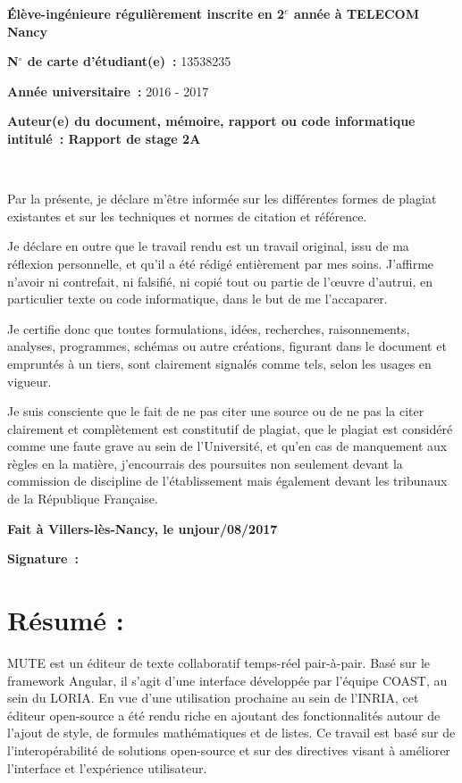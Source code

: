 \documentclass[12pt]{article}
\begin{document}
\textbf{\'{E}lève-ingénieure régulièrement inscrite en 2$^{e}$
année à TELECOM Nancy}

\textbf{N$^\circ{}$ de carte d'étudiant(e)~:} 13538235

\textbf{Année universitaire~:} 2016 - 2017

\textbf{Auteur(e) du document, m\'{e}moire, rapport ou code informatique
intitul\'{e}~: Rapport de stage 2A}

$ $


Par la présente, je déclare m'être informée sur les
différentes formes de plagiat existantes et sur les techniques et normes de
citation et référence.

Je déclare en outre que le travail rendu est un travail original, issu de ma
réflexion personnelle, et qu'il a été rédigé entièrement
par mes soins. J'affirme n'avoir ni contrefait, ni falsifié, ni copié
tout ou partie de l'\oe{}uvre d'autrui, en particulier texte ou code
informatique, dans le but de me l'accaparer.

Je certifie donc que toutes formulations, idées, recherches, raisonnements,
analyses, programmes, schémas ou autre créations, figurant dans le
document et empruntés à un tiers, sont clairement signalés comme
tels, selon les usages en vigueur.

Je suis consciente que le fait de ne pas citer une source ou de ne pas la
citer clairement et complètement est constitutif de plagiat, que le plagiat est
considéré comme une faute grave au sein de l'Université, et qu'en cas
de manquement aux règles en la matière, j'encourrais des poursuites non
seulement devant la commission de discipline de l'établissement mais
également devant les tribunaux de la République Française.

\begin{center}
\textbf{Fait à Villers-lès-Nancy, le unjour/08/2017}
\end{center}
\thispagestyle{empty}

\begin{center}
\textbf{Signature~:}
\end{center}

\newpage
\thispagestyle{empty}
\section*{Résumé :}
MUTE est un éditeur de texte collaboratif temps-réel pair-à-pair. Basé sur le framework Angular, il s'agit d'une interface développée par l'équipe COAST, au sein du LORIA. En vue d'une utilisation prochaine au sein de l'INRIA, cet éditeur open-source a été rendu riche en ajoutant des fonctionnalités autour de l'ajout de style, de formules mathématiques et de listes. Ce travail est basé sur de l'interopérabilité de solutions open-source et sur des directives visant à améliorer l'interface et l'expérience utilisateur.
\end{document}
